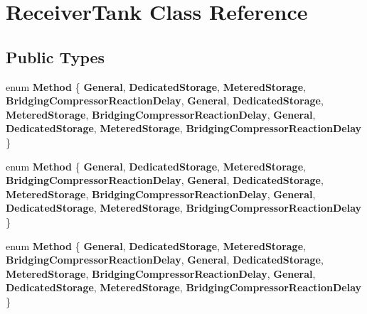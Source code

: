 \hypertarget{class_receiver_tank}{}\section{Receiver\+Tank Class Reference}
\label{class_receiver_tank}
\subsection*{Public Types}
\begin{DoxyCompactItemize}
\item 
\mbox{\label{class_receiver_tank_a8abbc7bc7f04ab853e1334c8905e5832}} 
enum {\bfseries Method} \{ \newline
{\bfseries General}, 
{\bfseries Dedicated\+Storage}, 
{\bfseries Metered\+Storage}, 
{\bfseries Bridging\+Compressor\+Reaction\+Delay}, 
\newline
{\bfseries General}, 
{\bfseries Dedicated\+Storage}, 
{\bfseries Metered\+Storage}, 
{\bfseries Bridging\+Compressor\+Reaction\+Delay}, 
\newline
{\bfseries General}, 
{\bfseries Dedicated\+Storage}, 
{\bfseries Metered\+Storage}, 
{\bfseries Bridging\+Compressor\+Reaction\+Delay}
 \}
\item 
\mbox{\label{class_receiver_tank_a8abbc7bc7f04ab853e1334c8905e5832}} 
enum {\bfseries Method} \{ \newline
{\bfseries General}, 
{\bfseries Dedicated\+Storage}, 
{\bfseries Metered\+Storage}, 
{\bfseries Bridging\+Compressor\+Reaction\+Delay}, 
\newline
{\bfseries General}, 
{\bfseries Dedicated\+Storage}, 
{\bfseries Metered\+Storage}, 
{\bfseries Bridging\+Compressor\+Reaction\+Delay}, 
\newline
{\bfseries General}, 
{\bfseries Dedicated\+Storage}, 
{\bfseries Metered\+Storage}, 
{\bfseries Bridging\+Compressor\+Reaction\+Delay}
 \}
\item 
\mbox{\label{class_receiver_tank_a8abbc7bc7f04ab853e1334c8905e5832}} 
enum {\bfseries Method} \{ \newline
{\bfseries General}, 
{\bfseries Dedicated\+Storage}, 
{\bfseries Metered\+Storage}, 
{\bfseries Bridging\+Compressor\+Reaction\+Delay}, 
\newline
{\bfseries General}, 
{\bfseries Dedicated\+Storage}, 
{\bfseries Metered\+Storage}, 
{\bfseries Bridging\+Compressor\+Reaction\+Delay}, 
\newline
{\bfseries General}, 
{\bfseries Dedicated\+Storage}, 
{\bfseries Metered\+Storage}, 
{\bfseries Bridging\+Compressor\+Reaction\+Delay}
 \}
\end{DoxyCompactItemize}

